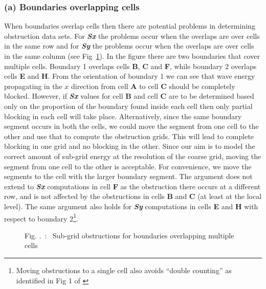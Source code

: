 \documentclass[12pt]{article}
\newcounter{myfigno}[section]
\newenvironment{myfig}[1]{\begin{figure}[#1]
                        \refstepcounter{myfigno}}
                       {\end{figure}}
\newcommand{\myfcapc}[1]{\begin{center} \ff Fig. \themyfigno\ :~ #1
                        \end{center}}
\renewcommand{\themyfigno}{\thesection.\arabic{myfigno}}
\begin{document}

\subsubsection*{(a) Boundaries overlapping cells}
When boundaries overlap cells then there are potential problems in determining obstruction data sets. For \textbf{\textit{Sx}} the problems occur when the overlaps are over cells in the same row and for \textbf{\textit{Sy}} the problems occur when the overlaps are over cells in the same column (see Fig~\ref{fig:subgrid2}). In the figure there are two boundaries that cover multiple cells. Boundary 1 overlaps cells {\bf B}, {\bf C} and {\bf F}, while boundary 2 overlaps cells {\bf E} and {\bf H}. From the orientation of boundary 1 we can see that wave energy propagating in the $x$ direction  from cell {\bf A} to cell {\bf C} should be completely blocked. However, if \textbf{\textit{Sx}} values for cell {\bf B} and cell {\bf C} are to be determined based only on the proportion of the boundary found inside each cell then only partial blocking in each cell will take place. Alternatively, since the same boundary segment occurs in both the cells, we could move the segment from one cell to the other and use that to compute the obstruction grids. This will lead to complete blocking in one grid and no blocking in the other. Since our aim is to model the correct amount of sub-grid energy at the resolution of the coarse grid, moving the segment from one cell to the other is acceptable. For convenience, we move the segments to the cell with the larger boundary segment. The argument does not extend to \textbf{\textit{Sx}} computations in cell {\bf F} as the obstruction there occurs at a different row, and is not affected by the obstructions in cells {\bf B} and {\bf C} (at least at the local level). The same argument also holds for \textbf{\textit{Sy}} computations in cells {\bf E} and {\bf H} with respect to boundary 2\footnote{Moving obstructions to a single cell also avoids ``double counting'' as identified in Fig 1 of \cite{tol2003}}. 

\begin{myfig}{tbp}
\centerline{}
\myfcapc{Sub-grid obstructions for boundaries overlapping multiple cells}
\label{fig:subgrid2}
\end{myfig}
 
\end{document}
